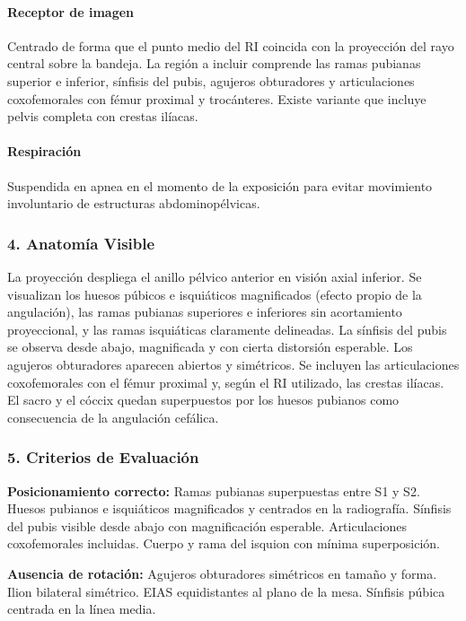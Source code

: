 	\paragraph{Receptor de imagen}
	Centrado de forma que el punto medio del RI coincida con la proyección del rayo central sobre la bandeja. La región a incluir comprende las ramas pubianas superior e inferior, sínfisis del pubis, agujeros obturadores y articulaciones coxofemorales con fémur proximal y trocánteres. Existe variante que incluye pelvis completa con crestas ilíacas.
	
	\paragraph{Respiración}
	Suspendida en apnea en el momento de la exposición para evitar movimiento involuntario de estructuras abdominopélvicas.
	
	\subsubsection*{4. Anatomía Visible}
	
	La proyección despliega el anillo pélvico anterior en visión axial inferior. Se visualizan los huesos púbicos e isquiáticos magnificados (efecto propio de la angulación), las ramas pubianas superiores e inferiores sin acortamiento proyeccional, y las ramas isquiáticas claramente delineadas. La sínfisis del pubis se observa desde abajo, magnificada y con cierta distorsión esperable. Los agujeros obturadores aparecen abiertos y simétricos. Se incluyen las articulaciones coxofemorales con el fémur proximal y, según el RI utilizado, las crestas ilíacas. El sacro y el cóccix quedan superpuestos por los huesos pubianos como consecuencia de la angulación cefálica.
	
	\subsubsection*{5. Criterios de Evaluación}
	
	\textbf{Posicionamiento correcto:} Ramas pubianas superpuestas entre S1 y S2. Huesos pubianos e isquiáticos magnificados y centrados en la radiografía. Sínfisis del pubis visible desde abajo con magnificación esperable. Articulaciones coxofemorales incluidas. Cuerpo y rama del isquion con mínima superposición.
	
	\textbf{Ausencia de rotación:} Agujeros obturadores simétricos en tamaño y forma. Ilion bilateral simétrico. EIAS equidistantes al plano de la mesa. Sínfisis púbica centrada en la línea media.
	

